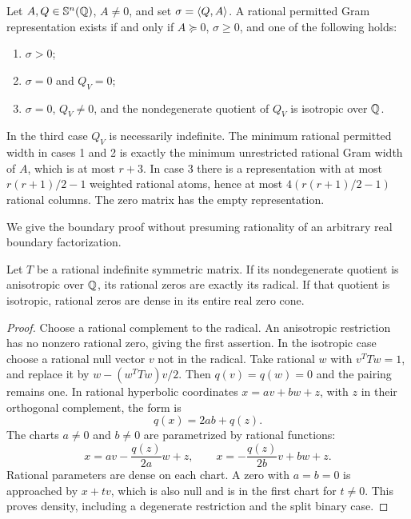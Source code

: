 \begin{theorem}\label{thm:main}
Let $A,Q\in\mathbb S^n(\mathbb Q)$, $A\ne0$, and set $\sigma=\langle Q,A\rangle$. A rational permitted Gram representation exists if and only if $A\succeq0$, $\sigma\geq0$, and one of the following holds:
\begin{enumerate}
\item $\sigma>0$;
\item $\sigma=0$ and $Q_V=0$;
\item $\sigma=0$, $Q_V\ne0$, and the nondegenerate quotient of $Q_V$ is isotropic over $\mathbb Q$.
\end{enumerate}
In the third case $Q_V$ is necessarily indefinite. The minimum rational permitted width in cases 1 and 2 is exactly the minimum unrestricted rational Gram width of $A$, which is at most $r+3$. In case 3 there is a representation with at most $r(r+1)/2-1$ weighted rational atoms, hence at most $4(r(r+1)/2-1)$ rational columns. The zero matrix has the empty representation.
\end{theorem}

We give the boundary proof without presuming rationality of an arbitrary real boundary factorization.
\begin{lemma}\label{lem:null}
Let $T$ be a rational indefinite symmetric matrix. If its nondegenerate quotient is anisotropic over $\mathbb Q$, its rational zeros are exactly its radical. If that quotient is isotropic, rational zeros are dense in its entire real zero cone.
\end{lemma}
\begin{proof}
Choose a rational complement to the radical. An anisotropic restriction has no nonzero rational zero, giving the first assertion. In the isotropic case choose a rational null vector $v$ not in the radical. Take rational $w$ with $v^TTw=1$, and replace it by $w-(w^TTw)v/2$. Then $q(v)=q(w)=0$ and the pairing remains one. In rational hyperbolic coordinates $x=av+bw+z$, with $z$ in their orthogonal complement, the form is
\[
 q(x)=2ab+q(z).
\]
The charts $a\ne0$ and $b\ne0$ are parametrized by rational functions:
\[
 x=av-\frac{q(z)}{2a}w+z,
 \qquad
 x=-\frac{q(z)}{2b}v+bw+z.
\]
Rational parameters are dense on each chart. A zero with $a=b=0$ is approached by $x+tv$, which is also null and is in the first chart for $t\ne0$. This proves density, including a degenerate restriction and the split binary case.
\end{proof}

